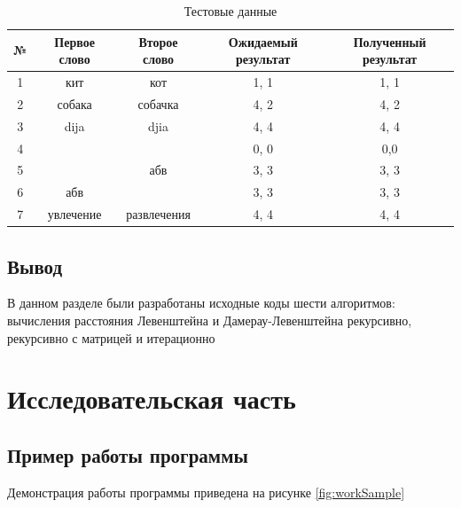 \documentclass[12pt]{report}
\begin{document}
    \begin{table}[H]
        \centering
        \caption{Тестовые данные}
        \label{tab:tests}
        \begin{tabular}{|c c c c c|}
            \hline
            № & Первое слово & Второе слово & Ожидаемый результат & Полученный результат \\ [0.8ex]
            \hline
            1 & кит          & кот         & 1, 1                & 1, 1                 \\
            \hline
            2 & собака       & собачка     & 4, 2                & 4, 2                 \\
            \hline
            3 & dija         & djia         & 4, 4                & 4, 4                 \\
            \hline
            4 &              &              & 0, 0                & 0,0                  \\
            \hline
            5 &              & абв          & 3, 3                & 3, 3                 \\
            \hline
            6 & абв          &              & 3, 3                & 3, 3                 \\
            \hline
            7 & увлечение        & развлечения        & 4, 4                & 4, 4                 \\
            \hline
        \end{tabular}
    \end{table}


    \section{Вывод}
    В данном разделе были разработаны исходные коды шести алгоритмов: вычисления расстояния
    Левенштейна и Дамерау-Левенштейна рекурсивно, рекурсивно с матрицей и итерационно


    \chapter{Исследовательская часть}


    \section{Пример работы программы}
    Демонстрация работы программы приведена на рисунке \ref{fig:workSample}
\end{document}
